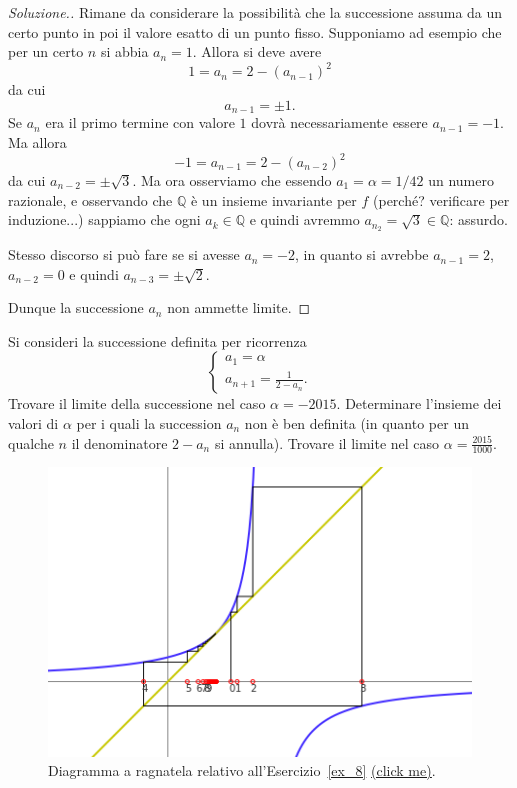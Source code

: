 \documentclass[italian,a4paper]{scrartcl}
\newcommand{\QQ}{{\mathbb Q}}
\newcommand{\online}[1]{\href{http://paolini.github.io/recurrence/?#1}{\underline{(click
      me)}}}
\begin{document}
\begin{proof}[Soluzione.]
  Rimane da considerare la possibilità che la successione assuma da un
  certo punto in poi il valore esatto di un punto fisso. Supponiamo ad
  esempio che per un certo $n$ si abbia $a_n=1$. Allora si deve avere
  \[
  1 = a_n = 2-(a_{n-1})^2
  \]
  da cui
  \[
  a_{n-1} = \pm 1.
  \]
  Se $a_n$ era il primo termine con valore $1$ dovrà necessariamente
  essere $a_{n-1} = -1$. Ma allora
  \[
  -1 = a_{n-1} = 2-(a_{n-2})^2
  \]
  da cui $a_{n-2} = \pm \sqrt 3$. Ma ora osserviamo che essendo $a_1=
  \alpha = 1/42$ un numero razionale, e osservando che $\QQ$ è un
  insieme invariante per $f$ (perché? verificare per induzione...)
  sappiamo che ogni $a_k \in \QQ$ e quindi
  avremmo $a_{n_2} = \sqrt 3 \in \QQ$: assurdo.

  Stesso discorso si può fare se si avesse $a_n=-2$, in quanto si
  avrebbe $a_{n-1} = 2$, $a_{n-2} = 0$ e quindi $a_{n-3}=\pm \sqrt 2$.

  Dunque la successione $a_n$ non ammette limite.
\end{proof}

\begin{exercise}\label{ex_8}
  Si consideri la successione definita per ricorrenza
  \[
  \begin{cases}
    a_1 = \alpha\\
    a_{n+1} = \frac{1}{2-a_n}.
  \end{cases}
  \]
  Trovare il limite della successione nel caso $\alpha =
  -2015$. Determinare l'insieme dei valori di $\alpha$ per i quali la
  succession $a_n$ non è ben definita (in quanto per un qualche $n$ il
  denominatore $2-a_n$ si annulla).
  Trovare il limite nel caso $\alpha=\frac{2015}{1000}$.
\end{exercise}

\begin{figure}
  \begin{center}
    \includegraphics[width=\textwidth]{fig_ex_8.png}
  \end{center}
  \caption{Diagramma a ragnatela relativo
    all'Esercizio~\ref{ex_8} \online{expr=1\%2F(2-x)&x=1.3&scale=50}.}
  \label{fig_ex_8}
\end{figure}
\end{document}
